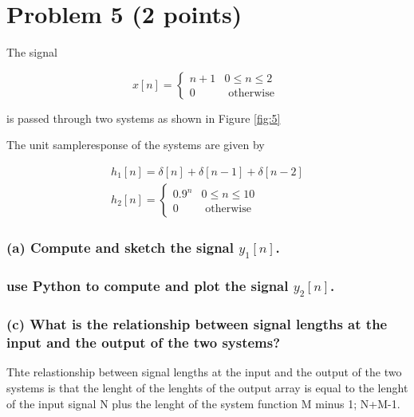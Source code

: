 \section{Problem 5 (2 points)}

The signal

\begin{equation*}
    x[n]=\left\{\begin{array}{ll}n+1 & 0 \leq n \leq 2 \\ 0 & \text { otherwise }\end{array}\right. 
\end{equation*}

is passed through two systems as shown in Figure \ref{fig:5}


The unit sampleresponse of the systems are given by

\begin{equation*}
    \begin{array}{l}h_{1}[n]=\delta[n]+\delta[n-1]+\delta[n-2] \\ h_{2}[n]=\left\{\begin{array}{ll}0.9^{n} & 0 \leq n \leq 10 \\ 0 & \text { otherwise }\end{array}\right.\end{array}
\end{equation*}

\subsubsection*{(a) Compute and sketch the signal $y_1[n]$.}


\subsubsection*{use Python to compute and plot the signal $y_2[n]$. }


\subsubsection*{(c) What is the relationship between signal lengths at the input and the output of the two systems?}

Thte relastionship between signal lengths at the input and the output of the two systems is that the lenght of the lenghts of the output array is equal to the lenght of the input signal {N} plus the lenght of the system function {M} minus 1; {N+M-1}.

